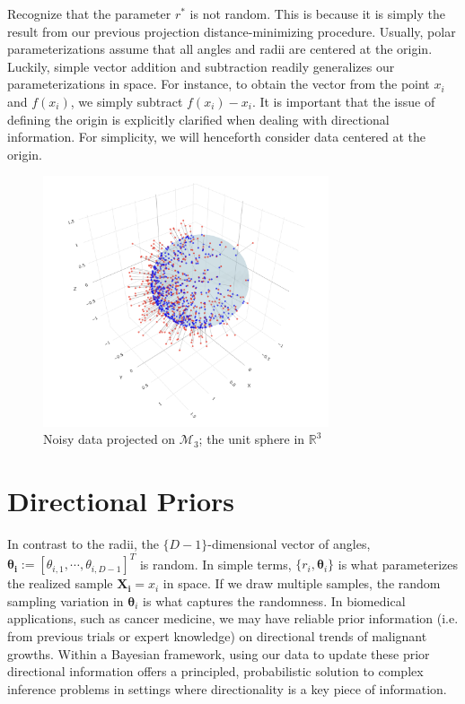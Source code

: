 \documentclass[twoside,11pt]{article}
\begin{document}
Recognize that the parameter $r^*$ is not random. This is because it is simply the result from our previous projection distance-minimizing procedure. Usually, polar parameterizations assume that all angles and radii are centered at the origin. Luckily, simple vector addition and subtraction readily generalizes our parameterizations in space. For instance, to obtain the vector from the point $x_i$ and $f(x_i)$, we simply subtract $f(x_i) - x_i$. It is important that the issue of defining the origin is explicitly clarified when dealing with directional information. For simplicity, we will henceforth consider data centered at the origin.

\begin{figure}[h!]
  \begin{center}
    \includegraphics[width=0.75\textwidth]{../fig/data-with-noise.png}
  \end{center}
  \caption{Noisy data projected on $\mathcal{M}_3$; the unit sphere in $\mathbb{R}^3$}\label{fig:data-with-noise}
\end{figure}


\section{Directional Priors}\label{sc:directional-priors}

In contrast to the radii, the $\{D-1\}$-dimensional vector of angles, $\boldsymbol{\theta_i} := [\theta_{i, 1}, \cdots, \theta_{i, D-1}]^T$ is random. In simple terms, $\{r_i, \boldsymbol{\theta}_i\}$ is what parameterizes the realized sample $\boldsymbol{X_i} = x_i$ in space. If we draw multiple samples, the random sampling variation in $\mathbf{\theta}_i$ is what captures the randomness. In biomedical applications, such as cancer medicine, we may have reliable prior information (i.e. from previous trials or expert knowledge) on directional trends of malignant growths. Within a Bayesian framework, using our data to update these prior directional information offers a principled, probabilistic solution to complex inference problems in settings where directionality is a key piece of information.   
\end{document}
